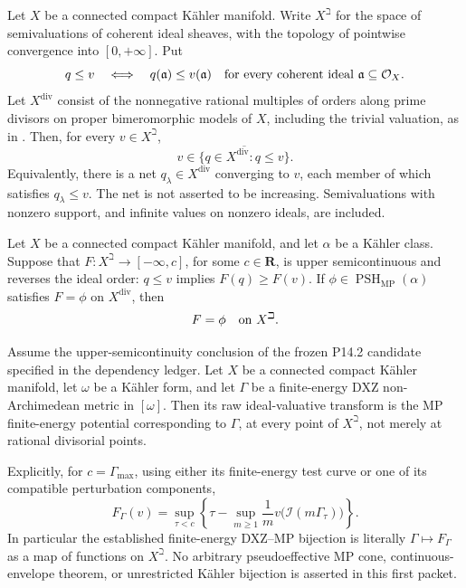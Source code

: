 \begin{theorem}\label{thm:p143-dominated-divisorial}
Let \(X\) be a connected compact K\"ahler manifold. Write \(X^\beth\) for
the space of semivaluations of coherent ideal sheaves, with the topology
of pointwise convergence into \([0,+\infty]\). Put
\[
 q\leq v\quad\Longleftrightarrow\quad
 q(\mathfrak a)\leq v(\mathfrak a)
 \quad\hbox{for every coherent ideal }\mathfrak a\subseteq\mathcal O_X .
\]
Let \(X^{\mathrm{div}}\) consist of the nonnegative rational multiples
of orders along prime divisors on proper bimeromorphic models of \(X\),
including the trivial valuation, as in \cite[Definition~2.3.1]{MP24}.
Then, for every \(v\in X^\beth\),
\begin{equation}
 v\in\overline{\{q\in X^{\mathrm{div}}:q\leq v\}}.
 \label{eq:p143-dominated-closure}
\end{equation}
Equivalently, there is a net \(q_\lambda\in X^{\mathrm{div}}\) converging
to \(v\), each member of which satisfies \(q_\lambda\leq v\).
The net is not asserted to be increasing. Semivaluations with nonzero
support, and infinite values on nonzero ideals, are included.
\end{theorem}

\begin{corollary}\label{cor:p143-usc-antitone-comparison}
Let \(X\) be a connected compact K\"ahler manifold, and let \(\alpha\)
be a K\"ahler class. Suppose that \(F:X^\beth\to[-\infty,c]\), for some
\(c\in\mathbf R\), is upper semicontinuous and reverses the ideal order:
\(q\leq v\) implies \(F(q)\geq F(v)\).
If \(\phi\in\operatorname{PSH}_{\mathrm{MP}}(\alpha)\) satisfies
\(F=\phi\) on \(X^{\mathrm{div}}\), then
\begin{equation}
                         F=\phi\quad\hbox{on }X^\beth.
 \label{eq:p143-all-point-comparison}
\end{equation}
\end{corollary}

\begin{corollary}\label{cor:p143-finite-energy-realization}
Assume the upper-semicontinuity conclusion of the frozen P14.2 candidate
specified in the dependency ledger. Let \(X\) be a connected compact
K\"ahler manifold, let \(\omega\) be a K\"ahler form, and let \(\Gamma\)
be a finite-energy DXZ non-Archimedean metric in \([\omega]\).
Then its raw ideal-valuative transform is the MP finite-energy potential
corresponding to \(\Gamma\), at every point of \(X^\beth\), not merely
at rational divisorial points.

Explicitly, for \(c=\Gamma_{\max}\), using either its finite-energy test
curve or one of its compatible perturbation components,
\begin{equation}
 F_\Gamma(v)=
 \sup_{\tau<c}\left\{\tau-
     \sup_{m\geq1}\frac1m v\bigl(\mathcal I(m\Gamma_\tau)\bigr)\right\}.
 \label{eq:p143-raw-transform}
\end{equation}
In particular the established finite-energy DXZ--MP bijection is
literally \(\Gamma\mapsto F_\Gamma\) as a map of functions on \(X^\beth\).
No arbitrary pseudoeffective MP cone, continuous-envelope theorem,
or unrestricted K\"ahler bijection is asserted in this first packet.
\end{corollary}
